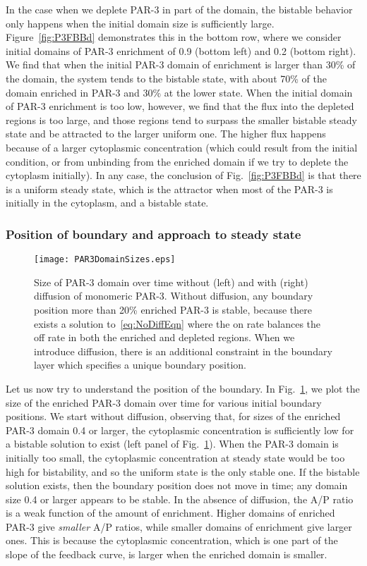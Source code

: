 \documentclass[11pt]{article}
\newcommand{\6}[1]{#1_{\text{6}}}
\newcommand{\3}[1]{#1_{\text{3}}}
\begin{document}
In the case when we deplete PAR-3 in part of the domain, the bistable behavior only happens when the initial domain size is sufficiently large. Figure\ \ref{fig:P3FBBd} demonstrates this in the bottom row, where we consider initial domains of PAR-3 enrichment of 0.9 (bottom left) and 0.2 (bottom right). We find that when the initial PAR-3 domain of enrichment is larger than 30\% of the domain, the system tends to the bistable state, with about 70\% of the domain enriched in PAR-3 and 30\% at the lower state. When the initial domain of PAR-3 enrichment is too low, however, we find that the flux into the depleted regions is too large, and those regions tend to surpass the smaller bistable steady state and be attracted to the larger uniform one. The higher flux happens because of a larger cytoplasmic concentration (which could result from the initial condition, or from unbinding from the enriched domain if we try to deplete the cytoplasm initially). In any case, the conclusion of Fig.\ \ref{fig:P3FBBd} is that there is a uniform steady state, which is the attractor when most of the PAR-3 is initially in the cytoplasm, and a bistable state.

\subsubsection{Position of boundary and approach to steady state}

\begin{figure}
\centering
\texttt{[image: PAR3DomainSizes.eps]}
\caption{\label{fig:WWoDiff}Size of PAR-3 domain over time without (left) and with (right) diffusion of monomeric PAR-3. Without diffusion, any boundary position more than 20\% enriched PAR-3 is stable, because there exists a solution to\ \eqref{eq:NoDiffEqn} where the on rate balances the off rate in both the enriched and depleted regions. When we introduce diffusion, there is an additional constraint in the boundary layer which specifies a unique boundary position.}
\end{figure}

Let us now try to understand the position of the boundary. In Fig.\ \ref{fig:WWoDiff}, we plot the size of the enriched PAR-3 domain over time for various initial boundary positions. We start without diffusion, observing that, for sizes of the enriched PAR-3 domain 0.4 or larger, the cytoplasmic concentration is sufficiently low for a bistable solution to exist (left panel of Fig.\ \ref{fig:WWoDiff}). When the PAR-3 domain is initially too small, the cytoplasmic concentration at steady state would be too high for bistability, and so the uniform state is the only stable one. If the bistable solution exists, then the boundary position does not move in time; any domain size 0.4 or larger appears to be stable. In the absence of diffusion, the A/P ratio is a weak function of the amount of enrichment. Higher domains of enriched PAR-3 give \emph{smaller} A/P ratios, while smaller domains of enrichment give larger ones. This is because the cytoplasmic concentration, which is one part of the slope of the feedback curve, is larger when the enriched domain is smaller. 
\end{document}
